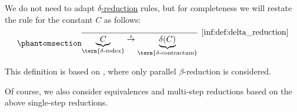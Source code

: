 \begin{definition}
   We do not need to adapt \hyperref[def:delta_reduction]{\( \delta \)-reduction} rules, but for completeness we will restate the rule for the constant \( C \) as follows:
  \begin{equation*}\taglabel[\ensuremath{ \logic{ParRed}_{\delta_C} }]{inf:def:parallel_reduction/delta}
    \begin{prooftree}
      \infer0[\ref{inf:def:delta_reduction}]{ \underbrace{C}_{\T{\term{\( \delta \)-redex}}} \dred \underbrace{\op*{\delta}(C)}_{\T{\term{\( \delta \)-contractum}}} }.
    \end{prooftree}
  \end{equation*}
\end{definition}
\begin{comments}
  \item This definition is based on \cite[\S 3.2.3]{Barendregt1984LambdaCalculus}, where only parallel \( \beta \)-reduction is considered.
  \item Of course, we also consider equivalences and multi-step reductions based on the above single-step reductions.
\end{comments}

